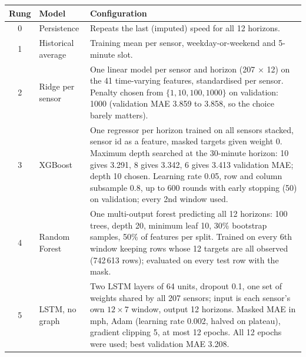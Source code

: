 \begin{tabularx}{\textwidth}{@{}clX@{}}
\toprule
Rung & Model & Configuration \\
\midrule
0 & Persistence & Repeats the last (imputed) speed for all 12 horizons. \\
1 & Historical average & Training mean per sensor, weekday-or-weekend and 5-minute slot. \\
2 & Ridge per sensor & One linear model per sensor and horizon (207 $\times$ 12) on the 41 time-varying features, standardised per sensor. Penalty chosen from $\{1, 10, 100, 1000\}$ on validation: 1000 (validation MAE 3.859 to 3.858, so the choice barely matters). \\
3 & XGBoost & One regressor per horizon trained on all sensors stacked, sensor id as a feature, masked targets given weight 0. Maximum depth searched at the 30-minute horizon: 10 gives 3.291, 8 gives 3.342, 6 gives 3.413 validation MAE; depth 10 chosen. Learning rate 0.05, row and column subsample 0.8, up to 600 rounds with early stopping (50) on validation; every 2nd window used. \\
4 & Random Forest & One multi-output forest predicting all 12 horizons: 100 trees, depth 20, minimum leaf 10, 30\% bootstrap samples, 50\% of features per split. Trained on every 6th window keeping rows whose 12 targets are all observed (742\,613 rows); evaluated on every test row with the mask. \\
5 & LSTM, no graph & Two LSTM layers of 64 units, dropout 0.1, one set of weights shared by all 207 sensors; input is each sensor's own $12 \times 7$ window, output 12 horizons. Masked MAE in mph, Adam (learning rate 0.002, halved on plateau), gradient clipping 5, at most 12 epochs. All 12 epochs were used; best validation MAE 3.208. \\
\bottomrule
\end{tabularx}
